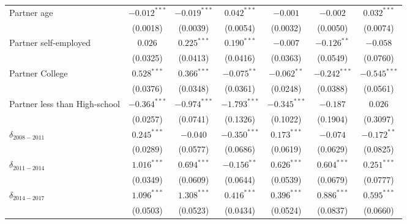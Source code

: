 \begin{tabular}{l|ccc|ccc}
Partner age                   &  $-0.012^{***}$ &  $-0.019^{***}$ &   $0.042^{***}$ &               $-0.001$ &        $-0.002$ &   $0.032^{***}$ \\
                              &        (0.0018) &        (0.0039) &        (0.0054) &               (0.0032) &        (0.0050) &        (0.0074) \\
Partner self-employed         &         $0.026$ &   $0.225^{***}$ &   $0.190^{***}$ &               $-0.007$ &   $-0.126^{**}$ &        $-0.058$ \\
                              &        (0.0325) &        (0.0413) &        (0.0416) &               (0.0363) &        (0.0549) &        (0.0760) \\
Partner College               &   $0.528^{***}$ &   $0.366^{***}$ &   $-0.075^{**}$ &          $-0.062^{**}$ &  $-0.242^{***}$ &  $-0.545^{***}$ \\
                              &        (0.0376) &        (0.0348) &        (0.0361) &               (0.0248) &        (0.0388) &        (0.0561) \\
Partner less than High-school &  $-0.364^{***}$ &  $-0.974^{***}$ &  $-1.793^{***}$ &         $-0.345^{***}$ &        $-0.187$ &         $0.026$ \\
                              &        (0.0257) &        (0.0741) &        (0.1326) &               (0.1022) &        (0.1904) &        (0.3097) \\
$\delta_{2008-2011}$          &   $0.245^{***}$ &        $-0.040$ &  $-0.350^{***}$ &          $0.173^{***}$ &        $-0.074$ &   $-0.172^{**}$ \\
                              &        (0.0289) &        (0.0577) &        (0.0686) &               (0.0619) &        (0.0629) &        (0.0825) \\
$\delta_{2011-2014}$          &   $1.016^{***}$ &   $0.694^{***}$ &   $-0.156^{**}$ &          $0.626^{***}$ &   $0.604^{***}$ &   $0.251^{***}$ \\
                              &        (0.0349) &        (0.0609) &        (0.0644) &               (0.0539) &        (0.0679) &        (0.0777) \\
$\delta_{2014-2017}$          &   $1.096^{***}$ &   $1.308^{***}$ &   $0.416^{***}$ &          $0.396^{***}$ &   $0.886^{***}$ &   $0.595^{***}$ \\
                              &        (0.0503) &        (0.0523) &        (0.0434) &               (0.0524) &        (0.0837) &        (0.0660) \\

\end{tabular}
